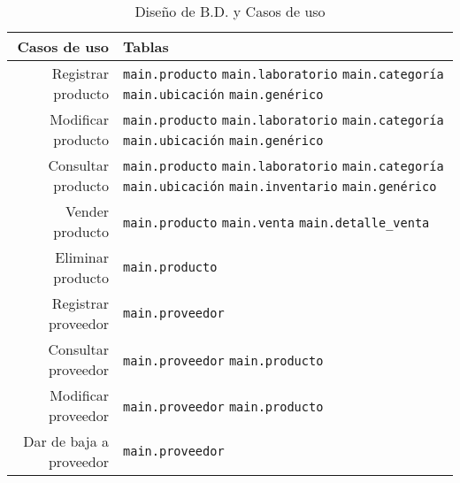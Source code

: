 \documentclass[a4paper,11pt, spanish]{report}
\newcommand{\inlinecode}[1]{%
  \colorbox{light-gray}{\texttt{#1}}
}
\begin{document}
{{{{{{{{{{{{\renewcommand{\arraystretch}{1.5}%
  \begin{table}[H]
  \begin{tabularx}{\textwidth}{r|X}
    \textbf{\large Casos de uso} & \textbf{\large Tablas}\\
      \hline
      Registrar producto & \inlinecode{main.producto} \newline
                           \inlinecode{main.laboratorio} \newline
                           \inlinecode{main.categoría} \newline
                           \inlinecode{main.ubicación} \newline
                           \inlinecode{main.genérico}  \\ \hline
      Modificar producto & \inlinecode{main.producto} \newline
                           \inlinecode{main.laboratorio} \newline
                           \inlinecode{main.categoría} \newline
                           \inlinecode{main.ubicación} \newline
                           \inlinecode{main.genérico}  \\ \hline
      Consultar producto & \inlinecode{main.producto} \newline
                           \inlinecode{main.laboratorio} \newline
                           \inlinecode{main.categoría} \newline
                           \inlinecode{main.ubicación} \newline
                           \inlinecode{main.inventario} \newline
                           \inlinecode{main.genérico}  \\
      \hline
      Vender producto & \inlinecode{main.producto} \newline
                        \inlinecode{main.venta} \newline
                        \inlinecode{main.detalle\_venta}\\
      \hline
      Eliminar producto & \inlinecode{main.producto}\\
      \hline
      Registrar proveedor & \inlinecode{main.proveedor} \\
      \hline
      Consultar proveedor & \inlinecode{main.proveedor} \newline
                            \inlinecode{main.producto}\\
      \hline
      Modificar proveedor & \inlinecode{main.proveedor} \newline
                            \inlinecode{main.producto}\\
      \hline
      Dar de baja a proveedor  & \inlinecode{main.proveedor}\\
  \end{tabularx}
  \caption{Diseño de B.D. y Casos de uso}
  \end{table}
\newpage
}}}}}}}}}}}}
\end{document}

